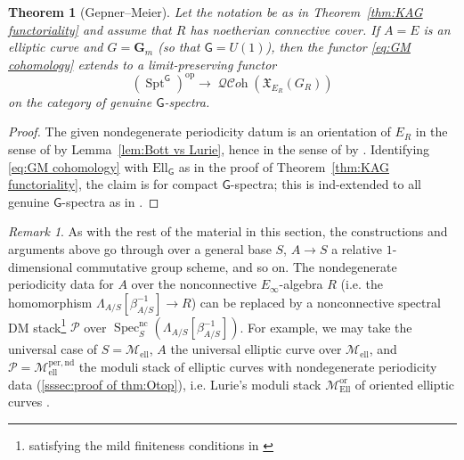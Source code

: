\documentclass[12pt, oneside]{amsart}
\numberwithin{equation}{section}
\newtheorem{theorem}[subsubsection]{Theorem}
\theoremstyle{remark}
\newtheorem{remark}[subsubsection]{Remark}
\theoremstyle{plain}
\DeclareMathOperator{\QCOH}{\mathcal{QC}\textit{oh}}
\newcommand{\frX}{\mathfrak{X}}
\newcommand{\lam}{\Lambda}
\newcommand{\Specnc}{\operatorname{Spec}^{\mathrm{nc}}}
\newcommand{\GGm}{\mathbf{G}_{m}}
\newcommand{\Mell}{\mathcal{M}_{\mathrm{ell}}}
\begin{document}
\begin{theorem}[Gepner--Meier]\label{thm:KAG genuine}
  Let the notation be as in Theorem~\ref{thm:KAG functoriality} and assume that $R$ has noetherian connective cover.
	If $A=E$ is an elliptic curve and $G=\GGm$ (so that $\mathsf{G}=U(1)$), then the functor \eqref{eq:GM cohomology} extends to a limit-preserving functor
  \[ (\operatorname{Spt}^{\mathsf{G}})^{\mathrm{op}} \to \QCOH(\frX_{E_R}(G_R)) \]
  on the category of genuine $\mathsf{G}$-spectra.
\end{theorem}

\begin{proof}
  The given nondegenerate periodicity datum is an orientation of $E_R$ in the sense of \cite[Def.~7.2.7]{LurieEll2} by Lemma~\ref{lem:Bott vs Lurie}, hence in the sense of \cite[Def.~5.17]{GepMei} by \cite[Prop.~4.3.23]{LurieEll2}.
  Identifying \eqref{eq:GM cohomology} with $\mathrm{Ell}_{\mathsf{G}}$ as in the proof of Theorem~\ref{thm:KAG functoriality}, the claim is \cite[Prop.~9.2]{GepMei} for compact $\mathsf{G}$-spectra; this is ind-extended to all genuine $\mathsf{G}$-spectra as in \cite[Constr.~9.3]{GepMei}.
\end{proof}

\begin{remark}\label{rem:GM general base}
  As with the rest of the material in this section, the constructions and arguments above go through over a general base $S$, $A \to S$ a relative $1$-dimensional commutative group scheme, and so on.
  The nondegenerate periodicity data for $A$ over the nonconnective $E_\infty$-algebra $R$ (i.e. the homomorphism $\lam_{A/S}[\beta_{A/S}^{-1}] \to R$) can be replaced by a nonconnective spectral DM stack\footnote{%
    satisfying the mild finiteness conditions in \cite[\S 1, Conventions]{GepMei}
  } $\mathcal{P}$ over $\Specnc_S(\lam_{A/S}[\beta_{A/S}^{-1}])$.
  For example, we may take the universal case of $S = \Mell$, $A$ the universal elliptic curve over $\Mell$, and $\mathcal{P} = \Mell^{\mathrm{per},\mathrm{nd}}$ the moduli stack of elliptic curves with nondegenerate periodicity data (\ref{sssec:proof of thm:Otop}), i.e. Lurie's moduli stack $\mathcal{M}_{\mathrm{Ell}}^{\mathrm{or}}$ of oriented elliptic curves \cite{LurieEll2}.
\end{remark}
\end{document}
